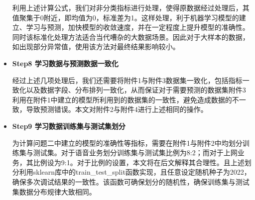 \documentclass{MathorCupmodeling}
\begin{document}
\begin{itemize}
		利用上述计算公式，我们对非分类指标进行处理，使得原数据经过处理后，其值聚集于0附近，即均值为0，标准差为1。这样处理，利于机器学习模型的建立、学习与预测，加快模型的收敛速度，并在一定程度上提升模型的准确性。同时该标准化处理方法适合当代嘈杂的大数据场景\textcolor{blue}{\cite{pstandard}}。因此对于大样本的数据，如出现部分异常值，使用该方法对最终结果影响较小。

		\item \textbf{Step8 学习数据与预测数据一致化}
		
		经过上述几项处理后，我们还需要将附件1与附件3数据集一致化，包括指标一致化以及数据字段、分布排列一致化，从而保证对于需要预测的数据集附件3利用在附件1中建立的模型所利用到的数据集的一致性，避免造成数据的不一致，导致预测错误。本文对附件2与附件4进行上述相同的操作。

		\item \textbf{Step9 学习数据训练集与测试集划分}
		
		为计算问题二中建立的模型的准确性等指标，需要在附件1与附件2中均划分训练集与测试集。对于语音业务划分训练集与测试集比例为8:2；而对于上网业务，其比例设为9:1。对于比例的设置，本文将在后文解释其合理性。且上述划分利用sklearn库中的train\_test\_split函数实现，且任意设定随机种子为2022，确保多次调试结果的一致性。该函数可确保划分的随机性，确保训练集与测试集数据分布规律大致相同。

	\end{itemize}
	
\end{document}
